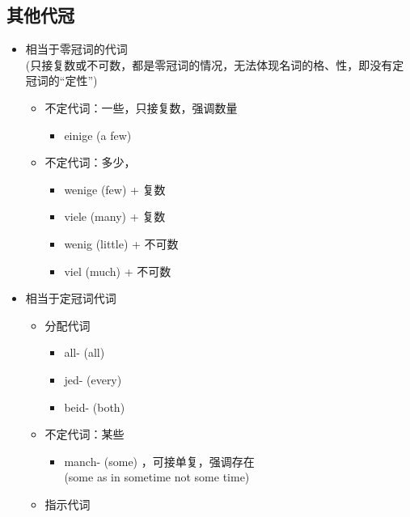 \subsection{其他代冠}
\begin{itemize}
    \item 相当于零冠词的代词 \\
          (只接复数或不可数，都是零冠词的情况，无法体现名词的格、性，即没有定冠词的“定性”)
          \begin{itemize}
              \item 不定代词：一些，只接复数，强调数量
                    \begin{itemize}
                        \item einige (a few)
                    \end{itemize}
              \item 不定代词：多少，
                    \begin{itemize}
                        \item wenige (few) + 复数
                        \item viele (many) + 复数
                        \item wenig (little) + 不可数
                        \item viel (much) + 不可数
                    \end{itemize}
          \end{itemize}
    \item 相当于定冠词代词
          \begin{itemize}
              \item 分配代词
                    \begin{itemize}
                        \item all- (all)
                        \item jed- (every)
                        \item beid- (both)
                    \end{itemize}
              \item 不定代词：某些
                    \begin{itemize}
                        \item manch- (some) ，可接单复，强调存在 \\
                              (some as in sometime not some time)
                    \end{itemize}
              \item 指示代词

\end{itemize}
\end{itemize}
